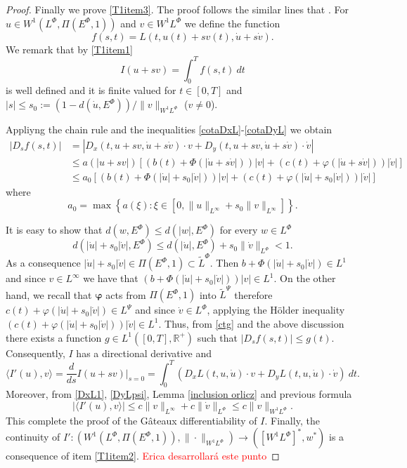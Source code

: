 \documentclass[twoside]{article}
\newcommand{\orlnor}{\|_{L^{\Phi}}}
\newcommand{\linf}{\|_{L^{\infty}}}
\newcommand{\lphi}{L^{\Phi}}
\newcommand{\ephi}{E^{\Phi}}
\newcommand{\claseor}{\widetilde{L}^{\Phi}}
\newcommand{\wphi}{W^{1}\lphi}
\newcommand{\sobnor}{\|_{W^{1}\lphi}}
\newcommand{\domi}{W^{1}(\lphi,\Pi(\ephi,1))}
\begin{document}
\begin{proof}
Finally we prove \ref{T1item3}. The proof follows the similar lines that \cite[Theorem 1.4]{mawhin2010critical}. For $u\in \domi$ and $v\in\wphi$ we define the function
\[f(s,t)=L(t,u(t)+sv(t),\dot{u}+s\dot{v}).\]
We remark that by \ref{T1item1}
\[I(u+sv)=\int_0^Tf(s,t)\ dt\]
is well defined and it is finite valued for $t\in [0,T]$ and  $|s|\leq s_0:=\left(1-d(\dot{u},\ephi)\right)/\|v\sobnor$ ($v\neq 0$).

Appliyng the chain rule and the inequalities \eqref{cotaDxL}-\eqref{cotaDyL} we obtain
\begin{equation}\label{ctg}
\begin{split}
|D_s f(s,t)|&=|D_x(t,u+sv,\dot{u}+s\dot{v})\cdot v + D_y(t,u+sv,\dot{u}+s\dot{v})\cdot \dot{v}| \\
&\leq a(|u+sv|)\left[(b(t)+\Phi(|\dot{u}+s\dot{v}|))|v|+ (c(t)+ \varphi(|\dot{u}+s\dot{v}|))|\dot{v}|\right]\\
& \leq a_0 \left[(b(t)+\Phi(|\dot{u}|+s_0|\dot{v}|))|v|+ (c(t)+ \varphi(|\dot{u}|+s_0|\dot{v}|))|\dot{v}|  \right]
\end{split}
\end{equation}
where
\[
 a_0 = \max \left\{ a(\xi): \xi\in \left[0, \|u \linf + s_0 \|v \linf \right] \right\}.
\]

It is easy to show that $d(w,\ephi)\leq d(|w|,\ephi)$ for every $w \in \lphi$
\[
d \left(|\dot{u}|+s_0|\dot{v}|, \ephi \right) %
\leq d \left(|\dot{u}|,\ephi \right)+ s_0 \|\dot{v}\orlnor < 1.
\]
As a consequence $|\dot{u}|+s_0|\dot{v}| \in \Pi(\ephi,1) \subset \claseor$. Then $b+\Phi(|\dot{u}|+s_0|\dot{v}|) \in L^1$ and since $v \in L^{\infty}$ we have that
$(b+\Phi(|\dot{u}|+s_0|\dot{v}|))|v| \in L^1$. On the other hand, we recall that $\boldsymbol{\varphi}$ acts from  $\Pi(\ephi,1)$ into $\tilde{L}^{\Psi}$ therefore
$c(t)+ \varphi(|\dot{u}|+s_0|\dot{v}|) \in L^{\Psi}$ and since $\dot{v} \in L^{\Phi}$, applying the H\"older inequality
$(c(t)+ \varphi(|\dot{u}|+s_0|\dot{v}|))|\dot{v}| \in L^1$. Thus, from \eqref{ctg} and the above discussion there exists a function $g \in L^1([0,T], \mathbb{R}^{+})$
such that $|D_s f(s,t)| \leq g(t)$. Consequently, $I$ has a directional derivative and
\[
\langle I'(u), v \rangle=\frac{d}{ds}I(u+sv)\big|_{s=0}=\int_0^T \left(D_{x}L(t,u,\dot{u})\cdot v+ D_{y}L(t,u,\dot{u})\cdot\dot{v}\right) \ dt.
\]
Moreover, from \eqref{DxL1}, \eqref{DyLpsi}, Lemma \ref{inclusion orlicz} and previous formula
\[
|\langle I'(u), v \rangle| \leq c \|v\linf + c \|\dot{v}\orlnor \leq c \|v\sobnor.
\]
This complete the proof of the G\^ateaux differentiability of $I$. Finally, the continuity of $I': \left(\domi, \|\cdot \sobnor\right) \to \left(\left[\wphi
\right]^*, w^* \right)$ is a consequence of item \ref{T1item2}. \textcolor{red}{Erica desarrollará este punto}
\end{proof}
\end{document}
